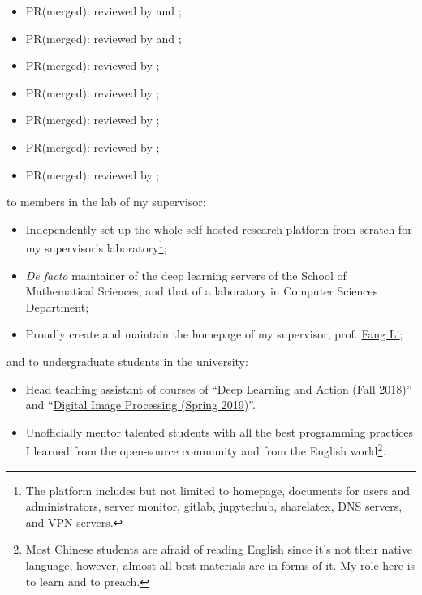 \begin{itemize}
    \item PR(merged):  reviewed by \evizero and \timholy;
    \item PR(merged):  reviewed by \evizero and \timholy;
    \item PR(merged):  reviewed by \julio;
    \item PR(merged):  reviewed by \timholy;
    \item PR(merged):  reviewed by \mbauman;
    \item PR(merged):  reviewed by \mikeinnes;
    \item PR(merged):  reviewed by \mikeinnes;
\end{itemize}
to members in the lab of my supervisor:
\begin{itemize}
    \item Independently set up the whole self-hosted research platform from scratch for my supervisor's laboratory\footnote{The platform includes but not limited to homepage, documents for users and administrators, server monitor, gitlab, jupyterhub, sharelatex, DNS servers, and VPN servers.};
    \item \textit{De facto} maintainer of the deep learning servers of the School of Mathematical Sciences, and that of a laboratory in Computer Sciences Department;
    \item Proudly create and maintain the homepage of my supervisor, prof. \href{http://math.ecnu.edu.cn/~fli/}{\textsf{Fang Li}};
\end{itemize}
and to undergraduate students in the university:
\begin{itemize}
    \item Head teaching assistant of courses of ``\href{http://math.ecnu.edu.cn/~fli/Teaching/DeepLearning/Fall2018/index.html}{Deep Learning and Action (Fall 2018)}''  and ``\href{http://math.ecnu.edu.cn/~fli/Teaching/DigitalImageProcessing/Spring2019/index.html}{Digital Image Processing (Spring 2019)}''.
    \item Unofficially mentor talented students with all the best programming practices I learned from the open-source community and from the English world\footnote{Most Chinese students are afraid of reading English since it's not their native language, however, almost all best materials are in forms of it. My role here is to learn and to preach.}.
\end{itemize}

